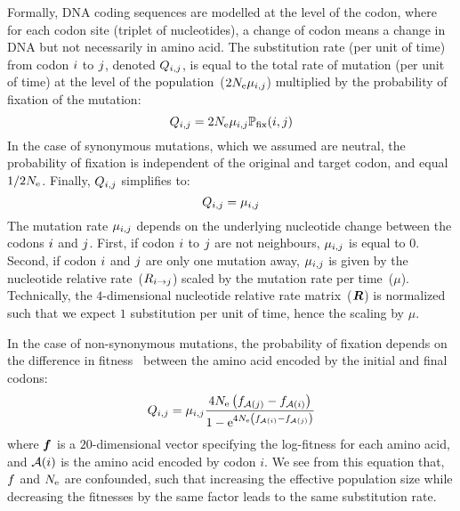 Formally, \acrshort{DNA} coding sequences are modelled at the level of the codon, where for each codon site (triplet of nucleotides), a change of codon means a change in \acrshort{DNA} but not necessarily in amino acid.
The substitution rate (per unit of time) from codon ${i}$ to ${j}$, denoted $Q_{{i}, {j}}$, is equal to the total rate of mutation (per unit of time) at the level of the population~($2N_{\mathrm{e}}\mu_{{i}, {j}}$) multiplied by the probability of fixation of the mutation:
\begin{equation}
{Q_{{i}, {j}}}
    = 2 N_{\mathrm{e}} \mu_{{i}, {j}} \mathbb{P}_{\mathrm{fix}}({i}, {j})
\end{equation}
In the case of synonymous mutations, which we assumed are neutral, the probability of fixation is independent of the original and target codon, and equal $1/2 N_{\mathrm{e}}$.
Finally, ${Q_{{i}, {j}}}$ simplifies to:
\begin{equation}
    Q_{{i}, {j}} = \mu_{{i}, {j}}
\end{equation}
The mutation rate $\mu_{{i}, {j}}$ depends on the underlying nucleotide change between the codons ${i}$ and ${j}$.
First, if codon ${i}$ to ${j}$ are not neighbours, $\mu_{{i}, {j}}$ is equal to $0$.
Second, if codon ${i}$ and ${j}$ are only one mutation away, $\mu_{{i}, {j}}$ is given by the nucleotide relative rate~(${R_{{i} \rightarrow {j}}}$) scaled by the mutation rate per time~($\mu$).
Technically, the $4$-dimensional nucleotide relative rate matrix~($\bm{R}$) is normalized such that we expect $1$ substitution per unit of time, hence the scaling by $\mu$.

In the case of non-synonymous mutations, the probability of fixation depends on the difference in fitness~\citep{Ohta1992} between the amino acid encoded by the initial and final codons:
\begin{equation}
    \label{eq:mutationSelection}
    {\submatrix_{\itoj}} = \mu_{\itoj} \dfrac{4 \Ne \left({\fitj - \fiti}\right)}{{1 - \e^{4 \Ne \left({\fiti - \fitj}\right)} }}
\end{equation}
where $\bm{f}$ is a $20$-dimensional vector specifying the log-fitness for each amino acid, and $\mathcal{A}({i})$ is the amino acid encoded by codon $i$.
We see from this equation that, $f$ and $N_{\mathrm{e}}$ are confounded, such that increasing the effective population size while decreasing the fitnesses by the same factor leads to the same substitution rate.

